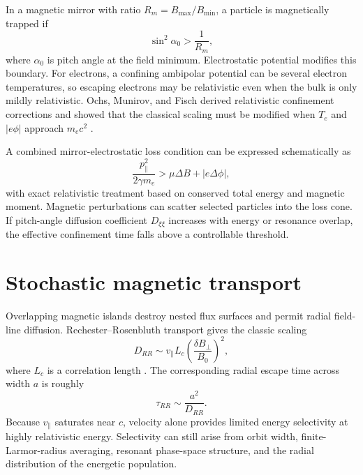 In a magnetic mirror with ratio $R_m=B_{\max}/B_{\min}$, a particle is magnetically trapped if
\begin{equation}
\sin^2\alpha_0>\frac{1}{R_m},
\label{eq:losscone}
\end{equation}
where $\alpha_0$ is pitch angle at the field minimum. Electrostatic potential modifies this boundary. For electrons, a confining ambipolar potential can be several electron temperatures, so escaping electrons may be relativistic even when the bulk is only mildly relativistic. Ochs, Munirov, and Fisch derived relativistic confinement corrections and showed that the classical scaling must be modified when $T_e$ and $|e\phi|$ approach $m_ec^2$ \cite{ochs2023mirror,pastukhov1974}.

A combined mirror-electrostatic loss condition can be expressed schematically as
\begin{equation}
\frac{p_\parallel^2}{2\gamma m_e}
>\mu\Delta B+|e\Delta\phi|,
\label{eq:mirror-potential}
\end{equation}
with exact relativistic treatment based on conserved total energy and magnetic moment. Magnetic perturbations can scatter selected particles into the loss cone. If pitch-angle diffusion coefficient $D_{\xi\xi}$ increases with energy or resonance overlap, the effective confinement time falls above a controllable threshold.

\section{Stochastic magnetic transport}

Overlapping magnetic islands destroy nested flux surfaces and permit radial field-line diffusion. Rechester--Rosenbluth transport gives the classic scaling
\begin{equation}
D_{RR}\sim v_\parallel L_c\left(\frac{\delta B_\perp}{B_0}\right)^2,
\label{eq:RR}
\end{equation}
where $L_c$ is a correlation length \cite{rechester1978}. The corresponding radial escape time across width $a$ is roughly
\begin{equation}
\tau_{RR}\sim\frac{a^2}{D_{RR}}.
\end{equation}
Because $v_\parallel$ saturates near $c$, velocity alone provides limited energy selectivity at highly relativistic energy. Selectivity can still arise from orbit width, finite-Larmor-radius averaging, resonant phase-space structure, and the radial distribution of the energetic population.

